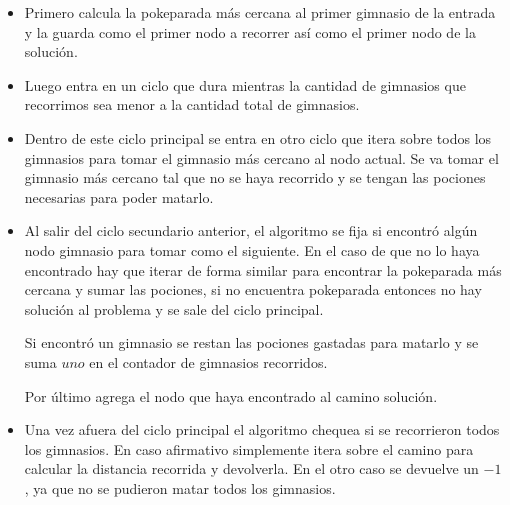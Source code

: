 \begin{itemize}
	\item Primero calcula la pokeparada más cercana al primer gimnasio de la entrada y la guarda como el primer nodo a recorrer así como el primer nodo de la solución.
	\item Luego entra en un ciclo que dura mientras la cantidad de gimnasios que recorrimos sea menor a la cantidad total de gimnasios.
	\item Dentro de este ciclo principal se entra en otro ciclo que itera sobre todos los gimnasios para tomar el gimnasio más cercano al nodo actual. Se va tomar el gimnasio más cercano tal que no se haya recorrido y se tengan las pociones necesarias para poder matarlo.
	\item Al salir del ciclo secundario anterior, el algoritmo se fija si encontró algún nodo gimnasio para tomar como el siguiente. En el caso de que no lo haya encontrado hay que iterar de forma similar para encontrar la pokeparada más cercana y sumar las pociones, si no encuentra pokeparada entonces no hay solución al problema y se sale del ciclo principal.
	\par Si encontró un gimnasio se restan las pociones gastadas para matarlo y se suma $uno$ en el contador de gimnasios recorridos. 
\par Por último agrega el nodo que haya encontrado al camino solución.
	\item Una vez afuera del ciclo principal el algoritmo chequea si se recorrieron todos los gimnasios. En caso afirmativo simplemente itera sobre el camino para calcular la distancia recorrida y devolverla. En el otro caso se devuelve un $-1$, ya que no se pudieron matar todos los gimnasios.
\end{itemize}

\medskip

